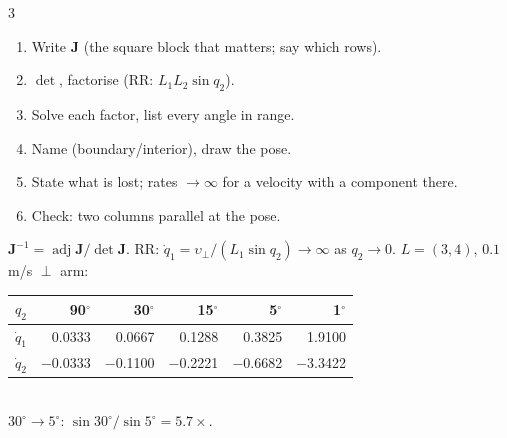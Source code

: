 \begin{multicols}{3}
\begin{recipe}
\begin{enumerate}
\item Write $\mathbf J$ (the square block that matters; say which rows).
\item $\det$, factorise (RR: $L_1L_2\sin q_2$).
\item Solve each factor, list every angle in range.
\item Name (boundary/interior), draw the pose.
\item State what is lost; rates $\to\infty$ for a velocity with a component there.
\item Check: two columns parallel at the pose.
\end{enumerate}
\end{recipe}
\begin{fbx}[Why rates blow up near $\det\mathbf J=0$ \added]
$\mathbf J^{-1}=\operatorname{adj}\mathbf J/\det\mathbf J$. RR: $\dot q_1=\upsilon_\perp/(L_1\sin q_2)\to\infty$ as $q_2\to0$. $L=(3,4)$, $0.1$ m/s $\perp$ arm:\\
{\small\begin{tabular}{@{}lrrrrr@{}}\toprule $q_2$&90$^\circ$&30$^\circ$&15$^\circ$&5$^\circ$&1$^\circ$\\\midrule
$\dot q_1$&0.0333&0.0667&0.1288&0.3825&1.9100\\$\dot q_2$&$-$0.0333&$-$0.1100&$-$0.2221&$-$0.6682&$-$3.3422\\\bottomrule\end{tabular}}\\
$30^\circ\to5^\circ$: $\sin30^\circ/\sin5^\circ=5.7\times$. \chk
\end{fbx}


\end{multicols}
